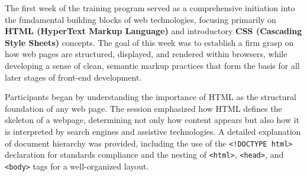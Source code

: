 \documentclass[a4paper,12pt,oneside]{report}
\numberwithin{equation}{chapter}
\numberwithin{figure}{chapter}
\numberwithin{table}{chapter}
\begin{document}
The first week of the training program served as a comprehensive initiation into the fundamental building blocks of web technologies, focusing primarily on \textbf{HTML (HyperText Markup Language)} and introductory \textbf{CSS (Cascading Style Sheets)} concepts. The goal of this week was to establish a firm grasp on how web pages are structured, displayed, and rendered within browsers, while developing a sense of clean, semantic markup practices that form the basis for all later stages of front-end development.

Participants began by understanding the importance of HTML as the structural foundation of any web page. The session emphasized how HTML defines the skeleton of a webpage, determining not only how content appears but also how it is interpreted by search engines and assistive technologies. A detailed explanation of document hierarchy was provided, including the use of the \texttt{<!DOCTYPE html>} declaration for standards compliance and the nesting of \texttt{<html>}, \texttt{<head>}, and \texttt{<body>} tags for a well-organized layout.
\end{document}
